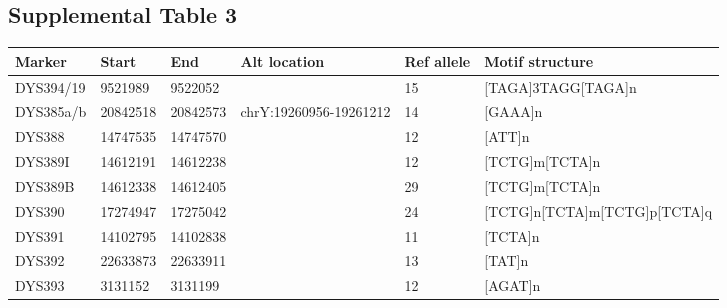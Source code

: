 \subsection{Supplemental Table 3}
\label{tab:sursuptab3}
\begin{tabularx}{\linewidth}{l l l l l l }
\hline
Marker & Start & End & Alt location & Ref allele & Motif structure \\
\hline
DYS394/19   & 9521989  & 9522052  &                        & 15 & {[}TAGA{]}3TAGG{[}TAGA{]}n                                                                                                           \\
DYS385a/b   & 20842518 & 20842573 & chrY:19260956-19261212 & 14 & {[}GAAA{]}n                                                                                                                          \\
DYS388      & 14747535 & 14747570 &                        & 12 & {[}ATT{]}n                                                                                                                           \\
DYS389I     & 14612191 & 14612238 &                        & 12 & {[}TCTG{]}m{[}TCTA{]}n                                                                                                               \\
DYS389B     & 14612338 & 14612405 &                        & 29 & {[}TCTG{]}m{[}TCTA{]}n                                                                                                               \\
DYS390      & 17274947 & 17275042 &                        & 24 & {[}TCTG{]}n{[}TCTA{]}m{[}TCTG{]}p{[}TCTA{]}q                                                                                         \\
DYS391      & 14102795 & 14102838 &                        & 11 & {[}TCTA{]}n                                                                                                                          \\
DYS392      & 22633873 & 22633911 &                        & 13 & {[}TAT{]}n                                                                                                                           \\
DYS393      & 3131152  & 3131199  &                        & 12 & {[}AGAT{]}n                                                                                                                          \\

\end{tabularx}
